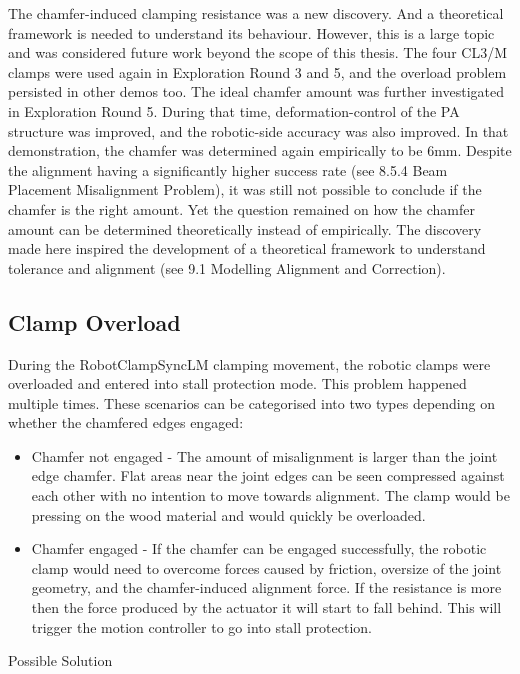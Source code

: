 The chamfer-induced clamping resistance was a new discovery. And a theoretical framework is needed to understand its behaviour. However, this is a large topic and was considered future work beyond the scope of this thesis. The four CL3/M clamps were used again in Exploration Round 3 and 5, and the overload problem persisted in other demos too. 
The ideal chamfer amount was further investigated in Exploration Round 5. During that time, deformation-control of the PA structure was improved, and the robotic-side accuracy was also improved. In that demonstration, the chamfer was determined again empirically to be 6mm. Despite the alignment having a significantly higher success rate (see 8.5.4 Beam Placement Misalignment Problem), it was still not possible to conclude if the chamfer is the right amount.
Yet the question remained on how the chamfer amount can be determined theoretically instead of empirically. The discovery made here inspired the development of a theoretical framework to understand tolerance and alignment (see 9.1 Modelling Alignment and Correction).

\subsection{Clamp Overload}
\label{subsection:exploration_2_clamp_overload}

During the RobotClampSyncLM clamping movement, the robotic clamps were overloaded and entered into stall protection mode. This problem happened multiple times. These scenarios can be categorised into two types depending on whether the chamfered edges engaged:
\begin{itemize}
    \item Chamfer not engaged - The amount of misalignment is larger than the joint edge chamfer. Flat areas near the joint edges can be seen compressed against each other with no intention to move towards alignment. The clamp would be pressing on the wood material and would quickly be overloaded.
    \item Chamfer engaged - If the chamfer can be engaged successfully, the robotic clamp would need to overcome forces caused by friction, oversize of the joint geometry, and the chamfer-induced alignment force. If the resistance is more then the force produced by the actuator it will start to fall behind. This will trigger the motion controller to go into stall protection.
\end{itemize}

Possible Solution

